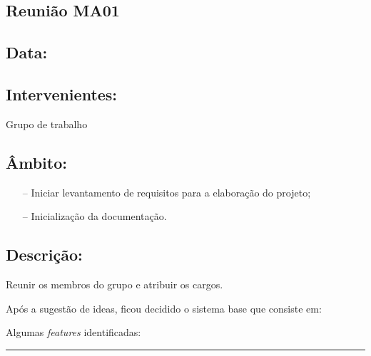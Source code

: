 
\subsection{Reunião MA01}\label{reuniaoMA01}

\subsection*{Data:}


\subsection*{Intervenientes:}
Grupo de trabalho

\subsection*{Âmbito:}
\begin{itemize}
\item[--] Iniciar levantamento de requisitos para a elaboração do projeto;
\item[--] Inicialização da documentação.
\end{itemize}

\subsection*{Descrição:}

\noindent Reunir os membros do grupo e atribuir os cargos.

\noindent Após a sugestão de ideas, ficou decidido o sistema base que consiste em:

\noindent Algumas \textit{features} identificadas:

\noindent \rule{\linewidth}{0.4pt}
\newline
